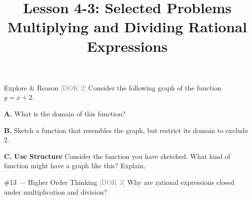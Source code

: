 \documentclass[11pt]{article}
\title{\textbf{Lesson 4-3: Selected Problems} \\ \large Multiplying and Dividing Rational Expressions}
\author{}
\date{}
\newcommand{\doktag}[1]{\hfill\textcolor{gray}{\small\textsf{[DOK #1]}}}
\newcommand{\workspace}[1]{\vspace{#1}}
\begin{document}
\maketitle
\vspace{-2em}

\begin{problem}{Explore \& Reason \doktag{2}}
Consider the following graph of the function $y = x + 2$.

\begin{center}
\end{center}

\textbf{A.} What is the domain of this function?
\workspace{2.5cm}

\textbf{B.} Sketch a function that resembles the graph, but restrict its domain to exclude $2$.
\workspace{5cm}

\textbf{C.} \textbf{Use Structure} Consider the function you have sketched. What kind of function might have a graph like this? Explain.
\workspace{3cm}
\end{problem}

\newpage

\begin{problem}{\#13 --- Higher Order Thinking \doktag{3}}
Why are rational expressions closed under multiplication and division?
\workspace{8cm}
\end{problem}

\vspace{1em}
\end{document}
